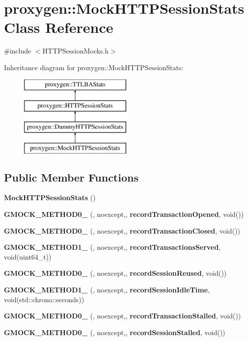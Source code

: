 \section{proxygen\+:\+:Mock\+H\+T\+T\+P\+Session\+Stats Class Reference}
\label{classproxygen_1_1MockHTTPSessionStats}


{\ttfamily \#include $<$H\+T\+T\+P\+Session\+Mocks.\+h$>$}

Inheritance diagram for proxygen\+:\+:Mock\+H\+T\+T\+P\+Session\+Stats\+:\begin{figure}[H]
\begin{center}
\leavevmode
\includegraphics[height=4.000000cm]{classproxygen_1_1MockHTTPSessionStats}
\end{center}
\end{figure}
\subsection*{Public Member Functions}
\begin{DoxyCompactItemize}
\item 
{\bf Mock\+H\+T\+T\+P\+Session\+Stats} ()
\item 
{\bf G\+M\+O\+C\+K\+\_\+\+M\+E\+T\+H\+O\+D0\+\_\+} (, noexcept,, {\bf record\+Transaction\+Opened}, void())
\item 
{\bf G\+M\+O\+C\+K\+\_\+\+M\+E\+T\+H\+O\+D0\+\_\+} (, noexcept,, {\bf record\+Transaction\+Closed}, void())
\item 
{\bf G\+M\+O\+C\+K\+\_\+\+M\+E\+T\+H\+O\+D1\+\_\+} (, noexcept,, {\bf record\+Transactions\+Served}, void(uint64\+\_\+t))
\item 
{\bf G\+M\+O\+C\+K\+\_\+\+M\+E\+T\+H\+O\+D0\+\_\+} (, noexcept,, {\bf record\+Session\+Reused}, void())
\item 
{\bf G\+M\+O\+C\+K\+\_\+\+M\+E\+T\+H\+O\+D1\+\_\+} (, noexcept,, {\bf record\+Session\+Idle\+Time}, void(std\+::chrono\+::seconds))
\item 
{\bf G\+M\+O\+C\+K\+\_\+\+M\+E\+T\+H\+O\+D0\+\_\+} (, noexcept,, {\bf record\+Transaction\+Stalled}, void())
\item 
{\bf G\+M\+O\+C\+K\+\_\+\+M\+E\+T\+H\+O\+D0\+\_\+} (, noexcept,, {\bf record\+Session\+Stalled}, void())
\end{DoxyCompactItemize}


